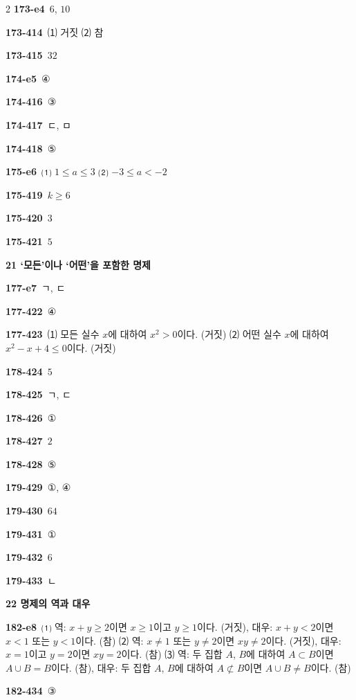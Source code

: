 \documentclass[10pt,a4paper]{article}
\begin{document}
\begin{multicols}{2}
\noindent\textbf{173-e4}\ $6$, $10$\par
\noindent\textbf{173-414}\ ⑴ 거짓 ⑵ 참\par
\noindent\textbf{173-415}\ $32$\par
\noindent\textbf{174-e5}\ ④\par
\noindent\textbf{174-416}\ ③\par
\noindent\textbf{174-417}\ ㄷ, ㅁ\par
\noindent\textbf{174-418}\ ⑤\par
\noindent\textbf{175-e6}\ ⑴ $1\le a\le 3$ ⑵ $-3\le a<-2$\par
\noindent\textbf{175-419}\ $k\ge 6$\par
\noindent\textbf{175-420}\ $3$\par
\noindent\textbf{175-421}\ $5$\par
\noindent\textbf{21 ‘모든’이나 ‘어떤’을 포함한 명제}\par\smallskip
\noindent\textbf{177-e7}\ ㄱ, ㄷ\par
\noindent\textbf{177-422}\ ④\par
\noindent\textbf{177-423}\ ⑴ 모든 실수 $x$에 대하여 $x^2>0$이다. (거짓) ⑵ 어떤 실수 $x$에 대하여 $x^2-x+4\le 0$이다. (거짓)\par
\noindent\textbf{178-424}\ $5$\par
\noindent\textbf{178-425}\ ㄱ, ㄷ\par
\noindent\textbf{178-426}\ ①\par
\noindent\textbf{178-427}\ $2$\par
\noindent\textbf{178-428}\ ⑤\par
\noindent\textbf{179-429}\ ①, ④\par
\noindent\textbf{179-430}\ $64$\par
\noindent\textbf{179-431}\ ①\par
\noindent\textbf{179-432}\ $6$\par
\noindent\textbf{179-433}\ ㄴ\par
\noindent\textbf{22 명제의 역과 대우}\par\smallskip
\noindent\textbf{182-e8}\ ⑴ 역: $x+y\ge 2$이면 $x\ge 1$이고 $y\ge 1$이다. (거짓), 대우: $x+y<2$이면 $x<1$ 또는 $y<1$이다. (참) ⑵ 역: $x\ne 1$ 또는 $y\ne 2$이면 $xy\ne 2$이다. (거짓), 대우: $x=1$이고 $y=2$이면 $xy=2$이다. (참) ⑶ 역: 두 집합 $A$, $B$에 대하여 $A\subset B$이면 $A\cup B=B$이다. (참), 대우: 두 집합 $A$, $B$에 대하여 $A\not\subset B$이면 $A\cup B\ne B$이다. (참)\par
\noindent\textbf{182-434}\ ③\par

\end{multicols}
\end{document}
